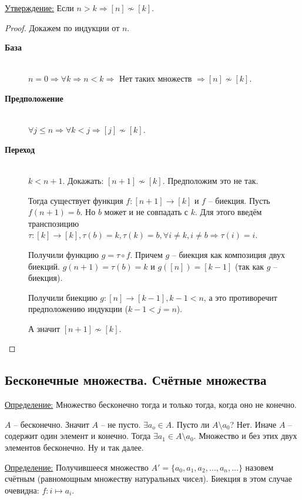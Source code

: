 \documentclass[a4paper, 12pt]{article}
\newcommand{\definition}{\underline{Определение:} }
\newcommand{\statement}{\underline{Утверждение:} }
\begin{document}
\statement Если $n > k \Rightarrow [n] \nsim [k]$.
\begin{proof}
    Докажем по индукции от $n$.
    \begin{description}
        \item[\textbf{База}] \hfill \\
            $n = 0 \Rightarrow \forall k \Rightarrow n < k \Rightarrow $ 
            Нет таких множеств $\Rightarrow [n] \nsim [k]$.
        \item[\textbf{Предположение}] \hfill \\
            $\forall j \leqslant n \Rightarrow \forall k < j \Rightarrow [j] \nsim [k]$.
        \item[\textbf{Переход}] \hfill \\
            $k < n + 1$. Докажать: $[n+1] \nsim [k]$. Предположим это не так.

            Тогда существует функция $f: [n+1] \to [k]$ и $f$ -- биекция. 
            Пусть $f(n+1) = b$. Но $b$ может и не совпадать с $k$. Для этого введём
            транспозицию $\tau: [k] \to [k], \tau(b) = k, \tau(k)=b,
            \forall i \neq k, i \neq b \Rightarrow \tau(i)=i$.

            Получили функцию $g = \tau \circ f$. Причем $g$ -- биекция как композиция
            двух биекций. $g(n+1)=\tau(b)=k$ и $g([n])=[k-1]$ (так как $g$ -- биекция).

            Получили биекцию $g: [n] \to [k-1], k - 1 < n$, а это противоречит 
            предположению индукции ($k-1 < j = n$).

            А значит $[n+1] \nsim [k]$.
    \end{description}
\end{proof}
\subsection*{Бесконечные множества. Счётные множества}
\definition Множество бесконечно тогда и только тогда, когда оно не конечно.

$A$ -- бесконечно. Значит $A$ -- не пусто. $\exists a_o \in A$. 
Пусто ли $A\setminus {a_0}$? Нет. Иначе $A$ -- содержит один элемент и конечно.
Тогда $\exists a_1 \in A\setminus {a_0}$. Множество и без этих двух элементов 
бесконечно. Ну и так далее.

\definition Получившееся множество $A' = \{a_0, a_1, a_2, \ldots, a_n, \ldots\}$ 
назовем счётным (равномощным множеству натуральных чисел).
Биекция в этом случае очевидна: $f: i \mapsto a_i$.
\end{document}
